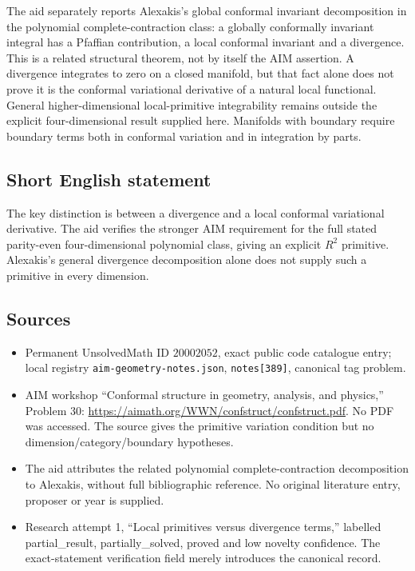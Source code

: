 \documentclass[11pt]{article}
\begin{document}
The aid separately reports Alexakis's global conformal invariant decomposition in the polynomial complete-contraction class: a globally conformally invariant integral has a Pfaffian contribution, a local conformal invariant and a divergence. This is a related structural theorem, not by itself the AIM assertion. A divergence integrates to zero on a closed manifold, but that fact alone does not prove it is the conformal variational derivative of a natural local functional. General higher-dimensional local-primitive integrability remains outside the explicit four-dimensional result supplied here. Manifolds with boundary require boundary terms both in conformal variation and in integration by parts.
\subsection{Short English statement}
The key distinction is between a divergence and a local conformal variational derivative. The aid verifies the stronger AIM requirement for the full stated parity-even four-dimensional polynomial class, giving an explicit \(R^2\) primitive. Alexakis's general divergence decomposition alone does not supply such a primitive in every dimension.
\subsection{Sources}
\begin{itemize}
\item Permanent UnsolvedMath ID \(20002052\), exact public code catalogue entry; local registry \texttt{aim-geometry-notes.json}, \texttt{notes[389]}, canonical tag problem.
\item AIM workshop ``Conformal structure in geometry, analysis, and physics,'' Problem 30: \url{https://aimath.org/WWN/confstruct/confstruct.pdf}. No PDF was accessed. The source gives the primitive variation condition but no dimension/category/boundary hypotheses.
\item The aid attributes the related polynomial complete-contraction decomposition to Alexakis, without full bibliographic reference. No original literature entry, proposer or year is supplied.
\item Research attempt 1, ``Local primitives versus divergence terms,'' labelled partial\_result, partially\_solved, proved and low novelty confidence. The exact-statement verification field merely introduces the canonical record.
\end{itemize}
\end{document}
